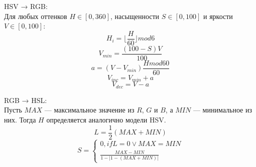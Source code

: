 HSV → RGB: \\
Для любых оттенков  ${\displaystyle H\in \left[0,360\right]}$, насыщенности  ${\displaystyle S\in \left[0,100\right]}$ и яркости ${\displaystyle V\in \left[0,100\right]}$:
 \begin{equation}
H_{i} = \lfloor\frac{H}{60}\rfloor mod6
\end{equation}
 \begin{equation}
V_{min} = \frac{(100-S)V}{100}
\end{equation}
 \begin{equation}
a=(V-V_{min}) \frac{Hmod60}{60}
\end{equation}
 \begin{equation}
V_{inc} = V_{min} + a
\end{equation}
 \begin{equation}
V_{dec} = V - a
\end{equation}

\begin{table}[h!]
\end{table}

RGB → HSL:\\
Пусть $MAX$ — максимальное значение из $R$, $G$ и $B$, а $MIN$ — минимальное из них. Тогда $H$ определяется аналогично модели HSV.
 \begin{equation}
L=\frac{1}{2}(MAX+MIN)
\end{equation}
 \begin{equation}
S={\begin{cases} 0, if  L = 0 \vee MAX = MIN \\
	 \frac{MAX-MIN}{1-|1-(MAX+MIN)|}
	\end{cases}}
\end{equation}


